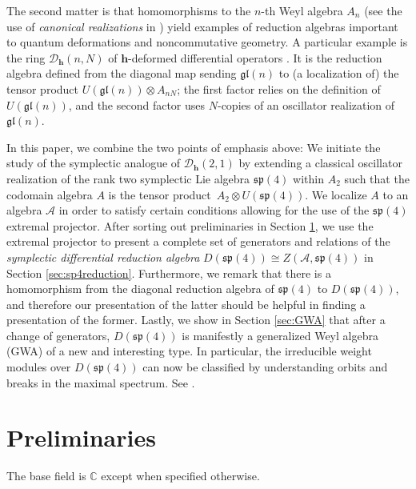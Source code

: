 \documentclass[10pt,a4paper]{amsart}
\numberwithin{equation}{section}
\begin{document}
The second matter is that homomorphisms to the $n$-th Weyl algebra $A_{n}$ (see the use of \emph{canonical realizations} in \cite[Definition 1]{havlicekCanonicalRealizationsLie1975}) yield examples of reduction algebras important to quantum deformations and noncommutative geometry. A particular example is the ring $\mathcal{D}_{\mathbf{h}}(n,N)$ of $\mathbf{h}$-deformed differential operators \cite{herlemontDifferentialCalculusMathbf2017}. It is the reduction algebra defined from the diagonal map sending $\mathfrak{gl}(n)$ to (a localization of) the tensor product $U(\mathfrak{gl}(n)) \otimes A_{nN}$; the first factor relies on the definition of $U(\mathfrak{gl}(n))$, and the second factor uses $N$-copies of an oscillator realization of~$\mathfrak{gl}(n)$.

In this paper, we combine the two points of emphasis above: We initiate the study of the symplectic analogue of $\mathcal{D}_{\mathbf{h}}(2,1)$ by extending a classical oscillator realization of the rank two symplectic Lie algebra $\mathfrak{sp}(4)$ within $A_{2}$ such that the codomain algebra $A$ is the tensor product~${A_2\otimes U(\mathfrak{sp}(4))}$. We localize $A$ to an algebra $\mathscr{A}$ in order to satisfy certain conditions allowing for the use of the $\mathfrak{sp}(4)$ extremal projector.
After sorting out preliminaries in Section \ref{sec:PreliminariesRedAlg}, we use the extremal projector to present a complete set of generators and relations of the \emph{symplectic differential reduction algebra} $D(\mathfrak{sp}(4)) \cong Z(\mathscr{A},\mathfrak{sp}(4))$ in Section \ref{sec:sp4reduction}. Furthermore, we remark that there is a homomorphism from the diagonal reduction algebra of $\mathfrak{sp}(4)$ to $D(\mathfrak{sp}(4))$, and therefore our presentation of the latter should be helpful in finding a presentation of the former.
Lastly, we show in Section \ref{sec:GWA} that after a change of generators, $D(\mathfrak{sp}(4))$ is manifestly a generalized Weyl algebra (GWA) of a new and interesting type. In particular, the irreducible weight modules over $D(\mathfrak{sp}(4))$ can now be classified by understanding orbits and breaks in the maximal spectrum. See \cite{bavula1992generalized,hartwigNoncommutativeFiberProducts2018,mazorchukAssociativeAlgebrasRelated2003}.

\section{Preliminaries}\label{sec:PreliminariesRedAlg}
The base field is $\mathbb{C}$ except when specified otherwise.
\end{document}
